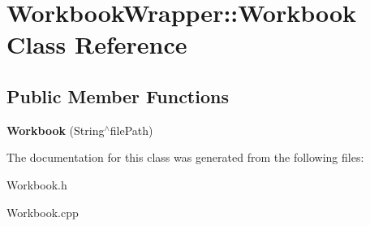 \hypertarget{class_workbook_wrapper_1_1_workbook}{}\section{Workbook\+Wrapper\+:\+:Workbook Class Reference}
\label{class_workbook_wrapper_1_1_workbook}
\subsection*{Public Member Functions}
\begin{DoxyCompactItemize}
\item 
\hypertarget{class_workbook_wrapper_1_1_workbook_abb15a32d1e3be4b3c7ef151990219e42}{}{\bfseries Workbook} (String$^\wedge$file\+Path)\label{class_workbook_wrapper_1_1_workbook_abb15a32d1e3be4b3c7ef151990219e42}

\end{DoxyCompactItemize}


The documentation for this class was generated from the following files\+:\begin{DoxyCompactItemize}
\item 
Workbook.\+h\item 
Workbook.\+cpp\end{DoxyCompactItemize}
